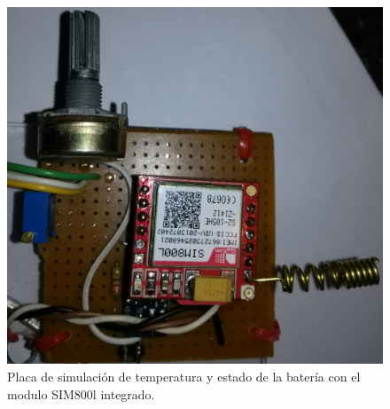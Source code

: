\begin{figure}[h]
    \centering
      \includegraphics[scale=.03]{./Figures/placa_basica.jpg}
        \caption{Placa de simulación de temperatura y estado de la batería con el modulo SIM800l integrado.}
          \label{fig:placa_básica}
        \end{figure}
%
%
%	
%
%
%
%
%
%
%	
%		
%
%		
%		
%		
%		
%


